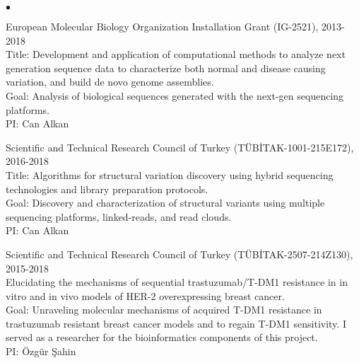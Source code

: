 \documentclass[margin,line]{res}
\newenvironment{list2}{
  \begin{list}{$\bullet$}{%
      \setlength{\itemsep}{0.1cm}
      \setlength{\parsep}{0in} \setlength{\parskip}{0in}
      \setlength{\topsep}{0in} \setlength{\partopsep}{0in} 
      \setlength{\leftmargin}{0.2in}}}{\end{list}}
\begin{document}
\begin{resume}
\begin{list2}
                                       
                                     \item
                                         European Molecular Biology Organization Installation Grant (IG-2521), 2013-2018 \\
                                         Title: Development and application of computational methods to analyze next generation sequence data to characterize both normal and disease causing variation, and build de novo genome assemblies.\\
                                         Goal: Analysis of biological sequences generated with the next-gen sequencing platforms.\\
                                         PI: Can Alkan
                                       \item
                                         Scientific and Technical Research Council of Turkey (T\"{U}B\.{I}TAK-1001-215E172), 2016-2018\\
                                         Title: Algorithms for structural variation discovery using hybrid sequencing technologies and library preparation protocols.\\
                                         Goal: Discovery and characterization of structural variants using multiple sequencing platforms, linked-reads, and read clouds.\\
                                         PI: Can Alkan
                                         \item
                                         Scientific and Technical Research Council of Turkey (T\"{U}B\.{I}TAK-2507-214Z130), 2015-2018\\
                                         Elucidating the mechanisms of sequential trastuzumab/T-DM1 resistance in in vitro and in vivo models of HER-2
                                         overexpressing breast cancer.\\
                                         Goal: Unraveling molecular mechanisms of acquired T-DM1 resistance in trastuzumab resistant breast 
                                         cancer models and to regain T-DM1 sensitivity. I served as a researcher 
                                         for the bioinformatics components of this project.\\
                                         PI: Özgür Şahin
\clearpage
                                       \item

\end{list2}
\end{resume}
\end{document}

